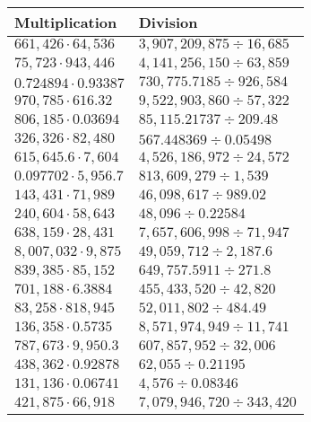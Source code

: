 \begin{longtable}[]{@{}ll@{}}
\toprule
Multiplication & Division\tabularnewline
\midrule
\endhead
\(661,426\cdot64,536\) & \(3,907,209,875÷16,685\)\tabularnewline
\(75,723\cdot943,446\) & \(4,141,256,150 ÷63,859\)\tabularnewline
\(0.724894\cdot0.93387\) & \(730,775.7185÷926,584\)\tabularnewline
\(970,785\cdot616.32\) & \(9,522,903,860÷57,322\)\tabularnewline
\(806,185\cdot0.03694\) & \(85,115.21737÷209.48\)\tabularnewline
\(326,326\cdot82,480\) & \(567.448369÷0.05498\)\tabularnewline
\(615,645.6\cdot7,604\) & \(4,526,186,972÷24,572\)\tabularnewline
\(0.097702\cdot5,956.7\) & \(813,609,279÷1,539\)\tabularnewline
\(143,431\cdot71,989\) & \(46,098,617÷989.02\)\tabularnewline
\(240,604\cdot58,643\) & \(48,096÷0.22584\)\tabularnewline
\(638,159\cdot28,431\) & \(7,657,606,998÷71,947\)\tabularnewline
\(8,007,032\cdot9,875\) & \(49,059,712÷2,187.6\)\tabularnewline
\(839,385\cdot85,152\) & \(649,757.5911÷271.8\)\tabularnewline
\(701,188\cdot6.3884\) & \(455,433,520÷42,820\)\tabularnewline
\(83,258\cdot818,945\) & \(52,011,802÷484.49\)\tabularnewline
\(136,358\cdot0.5735\) & \(8,571,974,949÷11,741\)\tabularnewline
\(787,673\cdot9,950.3\) & \(607,857,952÷32,006\)\tabularnewline
\(438,362\cdot0.92878\) & \(62,055÷0.21195\)\tabularnewline
\(131,136\cdot0.06741\) & \(4,576÷0.08346\)\tabularnewline
\(421,875\cdot66,918\) & \(7,079,946,720÷343,420\)\tabularnewline
\bottomrule
\end{longtable}
